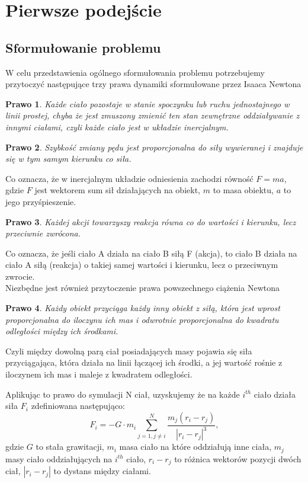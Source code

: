 \documentclass[14pt,twoside,a4paper]{article}
\newtheorem{theorem}{Prawo}
\begin{document}
\section{\LARGE Pierwsze podejście}
\bigskip

\subsection{\Large Sformułowanie problemu}
W celu przedstawienia ogólnego sformułowania problemu potrzebujemy przytoczyć następujące trzy prawa dynamiki sformułowane przez Isaaca Newtona \cite{fund}

\begin{theorem}
Każde ciało pozostaje w stanie spoczynku lub ruchu jednostajnego w linii prostej, chyba że jest zmuszony zmienić ten stan zewnętrzne oddziaływanie z innymi ciałami, czyli każde ciało jest w układzie inercjalnym.
\end{theorem}

\begin{theorem}
Szybkość zmiany pędu jest proporcjonalna do siły wywieranej i znajduje się w tym samym kierunku co siła.
\end{theorem}
Co oznacza, że w inercjalnym układzie odniesienia zachodzi równość $F=ma$, gdzie $F$ jest wektorem sum sił działających na obiekt, $m$ to masa obiektu, $a$ to jego przyśpieszenie.

\begin{theorem}
Każdej akcji towarzyszy reakcja równa co do wartości i kierunku, lecz przeciwnie zwrócona.
\end{theorem} 
Co oznacza, że jeśli ciało A działa na ciało B siłą F (akcja), to ciało B działa na ciało A siłą (reakcja) o takiej samej wartości i kierunku, lecz o przeciwnym zwrocie.\\

Niezbędne jest również przytoczenie prawa powszechnego ciążenia Newtona 
\begin{theorem}
Każdy obiekt przyciąga każdy inny obiekt z siłą, która jest wprost proporcjonalna do iloczynu ich mas i odwrotnie proporcjonalna do kwadratu odległości między ich środkami.
\end{theorem}
Czyli między dowolną parą ciał posiadających masy pojawia się siła przyciągająca, która działa na linii łączącej ich środki, a jej wartość rośnie z iloczynem ich mas i maleje z kwadratem odległości.


Aplikując to prawo do symulacji N ciał, uzyskujemy że na każde $i^{th}$ ciało działa siła $F_i$ zdefiniowana następująco:\\
$$F_i = -G\cdot m_i \sum_{j=1, j\neq i}^N \frac{m_j(r_i - r_j)}{|r_i - r_j|^3},$$gdzie $G$ to stała grawitacji, $m_i$ masa ciało na które oddziałują inne ciała, $m_j$ masy ciało oddziałujących na $i^{th}$ ciało, $r_i - r_j$ to różnica wektorów pozycji dwóch ciał, $|r_i - r_j|$ to dystans między ciałami. 
\end{document}
